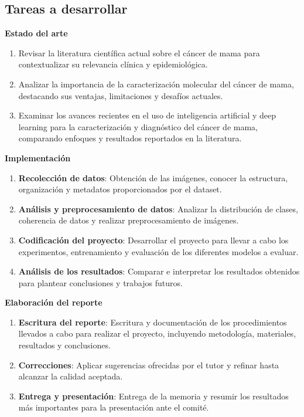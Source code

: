 \documentclass[a4paper,10pt]{book}
\begin{document}
\subsection{Tareas a desarrollar}

\textbf{Estado del arte}

\begin{enumerate}
	\item Revisar la literatura científica actual sobre el cáncer de mama para contextualizar su relevancia clínica y epidemiológica.
	\item Analizar la importancia de la caracterización molecular del cáncer de mama, destacando sus ventajas, limitaciones y desafíos actuales.
	\item Examinar los avances recientes en el uso de inteligencia artificial y deep learning para la caracterización y diagnóstico del cáncer de mama, comparando enfoques y resultados reportados en la literatura.
\end{enumerate}

\textbf{Implementación}

\begin{enumerate}
	\item \textbf{Recolección de datos}: Obtención de las imágenes, conocer la estructura, organización y metadatos proporcionados por el dataset.
	\item \textbf{Análisis y preprocesamiento de datos}: Analizar la distribución de clases, coherencia de datos y realizar preprocesamiento de imágenes.
	\item \textbf{Codificación del proyecto}: Desarrollar el proyecto para llevar a cabo los experimentos, entrenamiento y evaluación de los diferentes modelos a evaluar.
	\item \textbf{Análisis de los resultados}: Comparar e interpretar los resultados obtenidos para plantear conclusiones y trabajos futuros.
\end{enumerate}

\textbf{Elaboración del reporte}

\begin{enumerate}
	\item \textbf{Escritura del reporte}: Escritura y documentación de los procedimientos llevados a cabo para realizar el proyecto, incluyendo metodología, materiales, resultados y conclusiones.
	\item \textbf{Correcciones}: Aplicar sugerencias ofrecidas por el tutor y refinar hasta alcanzar la calidad aceptada.
	\item \textbf{Entrega y presentación}: Entrega de la memoria y resumir los resultados más importantes para la presentación ante el comité.
\end{enumerate}
\end{document}
